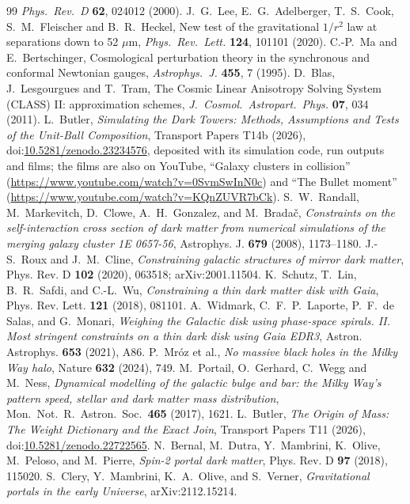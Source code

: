 \documentclass[11pt]{article}
\theoremstyle{definition}
\theoremstyle{plain}
\begin{document}
\begin{thebibliography}{99}
\emph{Phys.\ Rev.\ D} \textbf{62}, 024012 (2000).
 J.~G.~Lee, E.~G.~Adelberger, T.~S.~Cook, S.~M.~Fleischer and B.~R.~Heckel,
New test of the gravitational $1/r^{2}$ law at separations down to 52 $\mu$m,
\emph{Phys.\ Rev.\ Lett.} \textbf{124}, 101101 (2020).
 C.-P.~Ma and E.~Bertschinger,
Cosmological perturbation theory in the synchronous and conformal Newtonian gauges,
\emph{Astrophys.\ J.} \textbf{455}, 7 (1995).
 D.~Blas, J.~Lesgourgues and T.~Tram,
The Cosmic Linear Anisotropy Solving System (CLASS) II: approximation schemes,
\emph{J.\ Cosmol.\ Astropart.\ Phys.} \textbf{07}, 034 (2011).
 L.~Butler,
\emph{Simulating the Dark Towers: Methods, Assumptions and Tests of the Unit-Ball Composition},
Transport Papers T14b (2026), doi:\href{https://doi.org/10.5281/zenodo.23234576}{10.5281/zenodo.23234576}, deposited with its simulation code, run outputs and films; the films are also on YouTube, ``Galaxy clusters in collision'' (\url{https://www.youtube.com/watch?v=0SvmSwInN0c}) and ``The Bullet moment'' (\url{https://www.youtube.com/watch?v=KQnZUVR7bCk}).
 S.~W.~Randall, M.~Markevitch, D.~Clowe, A.~H.~Gonzalez, and M.~Brada\v{c},
\emph{Constraints on the self-interaction cross section of dark matter from numerical simulations of the merging galaxy cluster 1E 0657-56},
Astrophys. J. \textbf{679} (2008), 1173--1180.
 J.-S.~Roux and J.~M.~Cline,
\emph{Constraining galactic structures of mirror dark matter},
Phys. Rev. D \textbf{102} (2020), 063518; arXiv:2001.11504.
 K.~Schutz, T.~Lin, B.~R.~Safdi, and C.-L.~Wu,
\emph{Constraining a thin dark matter disk with Gaia},
Phys. Rev. Lett. \textbf{121} (2018), 081101.
 A.~Widmark, C.~F.~P.~Laporte, P.~F.~de Salas, and G.~Monari,
\emph{Weighing the Galactic disk using phase-space spirals. II. Most stringent constraints on a thin dark disk using Gaia EDR3},
Astron. Astrophys. \textbf{653} (2021), A86.
 P.~Mr\'oz et al.,
\emph{No massive black holes in the Milky Way halo},
Nature \textbf{632} (2024), 749.
 M.~Portail, O.~Gerhard, C.~Wegg and M.~Ness,
\emph{Dynamical modelling of the galactic bulge and bar: the Milky Way's pattern speed, stellar and dark matter mass distribution},
Mon.\ Not.\ R.\ Astron.\ Soc.\ \textbf{465} (2017), 1621.
 L.~Butler,
\emph{The Origin of Mass: The Weight Dictionary and the Exact Join},
Transport Papers T11 (2026), doi:\href{https://doi.org/10.5281/zenodo.22722565}{10.5281/zenodo.22722565}.
 N.~Bernal, M.~Dutra, Y.~Mambrini, K.~Olive, M.~Peloso, and M.~Pierre,
\emph{Spin-2 portal dark matter},
Phys. Rev. D \textbf{97} (2018), 115020.
 S.~Clery, Y.~Mambrini, K.~A.~Olive, and S.~Verner,
\emph{Gravitational portals in the early Universe},
arXiv:2112.15214.
\end{thebibliography}
\end{document}
